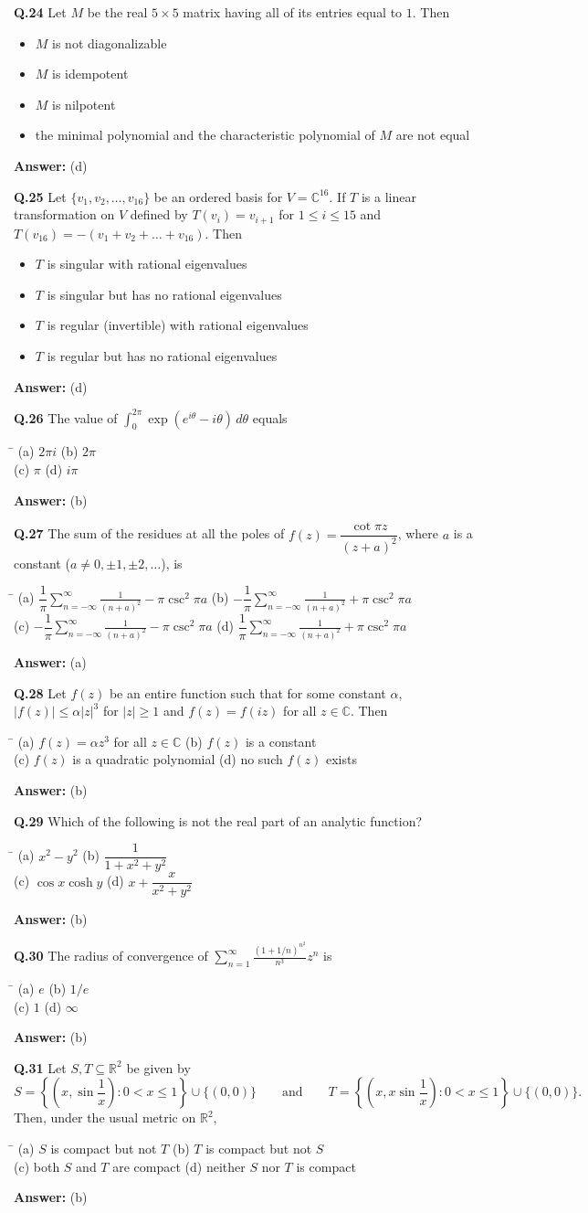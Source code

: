 \documentclass[11pt,a4paper]{article}
\newcommand{\optsfour}[4]{%
  \begin{tabbing}
    \hspace{0.48\linewidth}\=\kill
    (a) #1 \> (b) #2 \\[2pt]
    (c) #3 \> (d) #4
  \end{tabbing}%
}
\newcommand{\optslist}[4]{%
  \begin{itemize}
    \setlength{\itemsep}{2pt}\setlength{\parskip}{0pt}
    \item[(a)] #1
    \item[(b)] #2
    \item[(c)] #3
    \item[(d)] #4
  \end{itemize}%
}
\newcommand{\ans}[1]{\textbf{Answer:} #1\par\medskip}
\begin{document}
\textbf{Q.24} Let $M$ be the real $5 \times 5$ matrix having all of its entries equal to $1$. Then
\optslist{$M$ is not diagonalizable}{$M$ is idempotent}{$M$ is nilpotent}{the minimal polynomial and the characteristic polynomial of $M$ are not equal}
\ans{(d)}

\textbf{Q.25} Let $\{v_1, v_2, \dots, v_{16}\}$ be an ordered basis for $V = \mathbb{C}^{16}$. If $T$ is a linear transformation on $V$ defined by $T(v_i) = v_{i+1}$ for $1 \le i \le 15$ and $T(v_{16}) = -(v_1 + v_2 + \dots + v_{16})$. Then
\optslist{$T$ is singular with rational eigenvalues}{$T$ is singular but has no rational eigenvalues}{$T$ is regular (invertible) with rational eigenvalues}{$T$ is regular but has no rational eigenvalues}
\ans{(d)}

\textbf{Q.26} The value of $\displaystyle\int_0^{2\pi} \exp(e^{i\theta} - i\theta)\,d\theta$ equals
\optsfour{$2\pi i$}{$2\pi$}{$\pi$}{$i\pi$}
\ans{(b)}

\textbf{Q.27} The sum of the residues at all the poles of $f(z) = \dfrac{\cot \pi z}{(z + a)^2}$, where $a$ is a constant ($a \ne 0, \pm 1, \pm 2, \dots$), is
\optsfour{$\dfrac{1}{\pi}\displaystyle\sum_{n=-\infty}^{\infty} \frac{1}{(n + a)^2} - \pi\csc^2 \pi a$}{$-\dfrac{1}{\pi}\displaystyle\sum_{n=-\infty}^{\infty} \frac{1}{(n + a)^2} + \pi\csc^2 \pi a$}{$-\dfrac{1}{\pi}\displaystyle\sum_{n=-\infty}^{\infty} \frac{1}{(n + a)^2} - \pi\csc^2 \pi a$}{$\dfrac{1}{\pi}\displaystyle\sum_{n=-\infty}^{\infty} \frac{1}{(n + a)^2} + \pi\csc^2 \pi a$}
\ans{(a)}

\textbf{Q.28} Let $f(z)$ be an entire function such that for some constant $\alpha$, $|f(z)| \le \alpha|z|^3$ for $|z| \ge 1$ and $f(z) = f(iz)$ for all $z \in \mathbb{C}$. Then
\optsfour{$f(z) = \alpha z^3$ for all $z \in \mathbb{C}$}{$f(z)$ is a constant}{$f(z)$ is a quadratic polynomial}{no such $f(z)$ exists}
\ans{(b)}

\textbf{Q.29} Which of the following is not the real part of an analytic function?
\optsfour{$x^2 - y^2$}{$\dfrac{1}{1 + x^2 + y^2}$}{$\cos x \cosh y$}{$x + \dfrac{x}{x^2 + y^2}$}
\ans{(b)}

\textbf{Q.30} The radius of convergence of $\displaystyle\sum_{n=1}^{\infty} \frac{(1 + 1/n)^{n^2}}{n^3} z^n$ is
\optsfour{$e$}{$1/e$}{$1$}{$\infty$}
\ans{(b)}

\textbf{Q.31} Let $S, T \subseteq \mathbb{R}^2$ be given by
\[
  S = \left\{\left(x, \sin\frac{1}{x}\right) : 0 < x \le 1\right\} \cup \{(0, 0)\} \qquad \text{and} \qquad T = \left\{\left(x, x\sin\frac{1}{x}\right) : 0 < x \le 1\right\} \cup \{(0, 0)\}.
\]
Then, under the usual metric on $\mathbb{R}^2$,
\optsfour{$S$ is compact but not $T$}{$T$ is compact but not $S$}{both $S$ and $T$ are compact}{neither $S$ nor $T$ is compact}
\ans{(b)}
\end{document}
